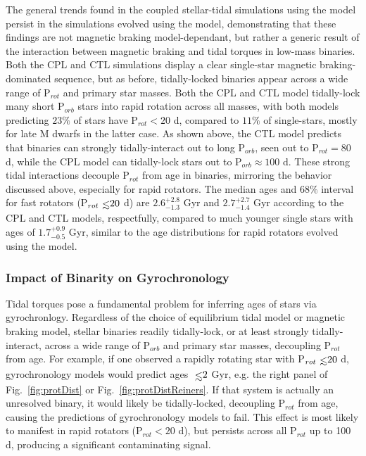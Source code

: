 \documentclass[twocolumn]{aastex61}
\def\lsim{~\rlap{$<$}{\lower 1.0ex\hbox{$\sim$}}}
\begin{document}
The general trends found in the coupled stellar-tidal simulations using the \citet{Matt2015} model persist in the simulations evolved using the \citet{Reiners2012} model, demonstrating that these findings are not magnetic braking model-dependant, but rather a generic result of the interaction between magnetic braking and tidal torques in low-mass binaries. Both the CPL and CTL simulations display a clear single-star magnetic braking-dominated sequence, but as before, tidally-locked binaries appear across a wide range of P$_{rot}$ and primary star masses. Both the CPL and CTL model tidally-lock many short P$_{orb}$ stars into rapid rotation across all masses, with both models predicting $23\%$ of stars have P$_{rot} < 20$ d, compared to $11\%$ of single-stars, mostly for late M dwarfs in the latter case. As shown above, the CTL model predicts that binaries can strongly tidally-interact out to long P$_{orb}$, seen out to P$_{rot} = 80$ d, while the CPL model can tidally-lock stars out to P$_{orb} \approx 100$ d. These strong tidal interactions decouple P$_{rot}$ from age in binaries, mirroring the behavior discussed above, especially for rapid rotators. The median ages and $68\%$ interval for fast rotators (P$_{rot} \lsim 20$ d) are $2.6^{+2.8}_{-1.3}$ Gyr and $2.7^{+2.7}_{-1.4}$ Gyr according to the CPL and CTL models, respectfully, compared to much younger single stars with ages of $1.7^{+0.9}_{-0.5}$ Gyr, similar to the age distributions for rapid rotators evolved using the \citet{Matt2015} model.   

\subsubsection{Impact of Binarity on Gyrochronology}

Tidal torques pose a fundamental problem for inferring ages of stars via gyrochronlogy. Regardless of the choice of equilibrium tidal model or magnetic braking model, stellar binaries readily tidally-lock, or at least strongly tidally-interact, across a wide range of P$_{orb}$ and primary star masses, decoupling P$_{rot}$ from age. For example, if one observed a rapidly rotating star with P$_{rot} \lsim 20$ d, gyrochronology models would predict ages $\lsim 2$ Gyr, e.g. the right panel of Fig.~\ref{fig:protDist} or Fig.~\ref{fig:protDistReiners}.  If that system is actually an unresolved binary, it would likely be tidally-locked, decoupling P$_{rot}$ from age, causing the predictions of gyrochronology models to fail. This effect is most likely to manifest in rapid rotators (P$_{rot} < 20$ d), but persists across all P$_{rot}$ up to 100 d, producing a significant contaminating signal. 
\end{document}
